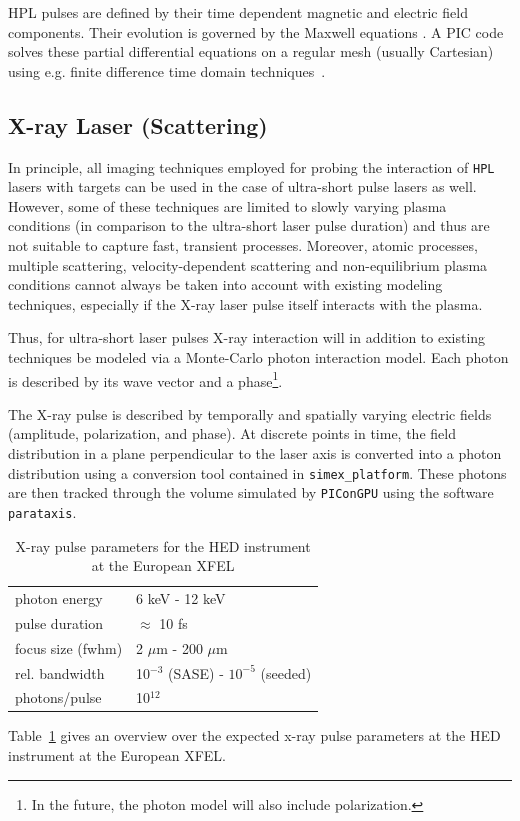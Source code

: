 \documentclass[12pt]{scrartcl}
\begin{document}
HPL pulses are defined by their time dependent
magnetic and electric field components. Their evolution is governed by the
Maxwell equations \cite{Jackson1975}. A PIC code solves these partial differential
equations on a regular mesh (usually
Cartesian) using e.g. finite difference time domain techniques~\cite{Yee1966}.

\subsection{X-ray Laser (Scattering)}

In principle, all imaging techniques employed for probing the interaction
of \texttt{HPL} lasers with targets can be used in the case of ultra-short
pulse lasers as well. However, some of these techniques are limited to slowly
varying plasma conditions (in comparison to the ultra-short laser pulse duration)
and thus are not suitable to capture fast, transient processes. Moreover, atomic
processes, multiple scattering, velocity-dependent scattering and
non-equilibrium plasma conditions cannot always be taken into account with
existing modeling techniques, especially if the X-ray laser pulse itself interacts
with the plasma.

Thus, for ultra-short laser pulses X-ray interaction will in addition to existing
techniques be modeled via a Monte-Carlo photon interaction model. Each photon is
described by its wave vector and a phase\footnote{In the future, the photon model
will also include polarization.}.

The X-ray pulse is described by temporally and spatially varying electric fields
(amplitude, polarization, and phase). At discrete points in time, the field
distribution in a plane perpendicular to the laser axis is converted into a
photon distribution using a conversion tool contained in
\texttt{simex\_platform}. These photons are then tracked through the volume simulated by
\texttt{PIConGPU} using the software \texttt{parataxis}.
\begin{table}[h]
  \centering
  \begin{tabular}{|l|l|}
    \hline
    photon energy &  6 keV - 12 keV \\
    pulse duration & $\approx$ 10 fs \\
    focus size (fwhm) & 2 $\mu\text{m}$ - 200 $\mu\text{m}$\\
    rel. bandwidth & 10$^{-3}$ (SASE) - $10^{-5}$ (seeded)\\
    photons/pulse & 10$^{12}$\\
    \hline
  \end{tabular}
  \caption{X-ray pulse parameters for the HED instrument at the European XFEL}
  \label{tab:xfel_sase2}
\end{table}
Table~\ref{tab:xfel_sase2} gives an overview over the expected x-ray pulse
parameters at the HED instrument at the European XFEL.
\end{document}

